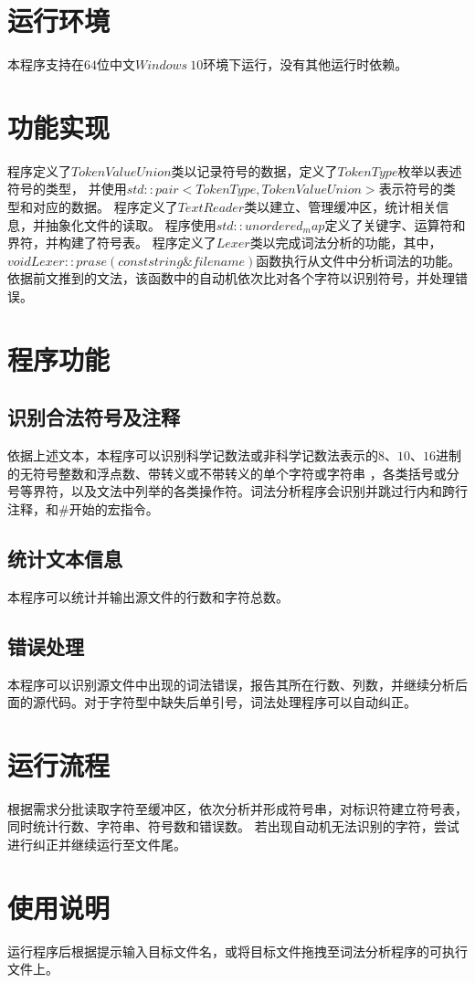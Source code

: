 \documentclass[UTF8]{ctexart}
\begin{document}
\section{运行环境}
本程序支持在$64$位中文$Windows \ 10$环境下运行，没有其他运行时依赖。
\section{功能实现}
程序定义了$TokenValueUnion$类以记录符号的数据，定义了$TokenType$枚举以表述符号的类型，
并使用$std::pair<TokenType, TokenValueUnion>$表示符号的类型和对应的数据。
程序定义了$TextReader$类以建立、管理缓冲区，统计相关信息，并抽象化文件的读取。
程序使用$std::unordered_map$定义了关键字、运算符和界符，并构建了符号表。
程序定义了$Lexer$类以完成词法分析的功能，其中，$void Lexer::prase(const string \&filename)$函数执行从文件中分析词法的功能。
依据前文推到的文法，该函数中的自动机依次比对各个字符以识别符号，并处理错误。
\section{程序功能}
\subsection{识别合法符号及注释}
依据上述文本，本程序可以识别科学记数法或非科学记数法表示的$8$、$10$、$16$进制的无符号整数和浮点数、带转义或不带转义的单个字符或字符串
，各类括号或分号等界符，以及文法中列举的各类操作符。词法分析程序会识别并跳过行内和跨行注释，和$\#$开始的宏指令。
\subsection{统计文本信息}
本程序可以统计并输出源文件的行数和字符总数。
\subsection{错误处理}
本程序可以识别源文件中出现的词法错误，报告其所在行数、列数，并继续分析后面的源代码。对于字符型中缺失后单引号，词法处理程序可以自动纠正。
\section{运行流程}
根据需求分批读取字符至缓冲区，依次分析并形成符号串，对标识符建立符号表，同时统计行数、字符串、符号数和错误数。
若出现自动机无法识别的字符，尝试进行纠正并继续运行至文件尾。
\section{使用说明}
运行程序后根据提示输入目标文件名，或将目标文件拖拽至词法分析程序的可执行文件上。
\end{document}

